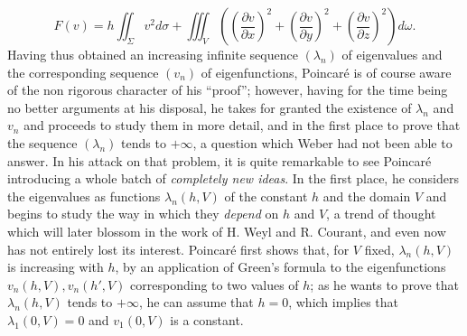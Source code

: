 \documentclass[12pt,a4paper,leqno,twoside]{extbook}
\newcommand{\pder}[2]{\frac{\partial #1}{\partial #2}}
\newcommand{\divergence}[1]{\left(\pder{#1}{x}\right)^2 + \left(\pder{#1}{y}\right)^2 + \left(\pder{#1}{z}\right)^2}
\begin{document}
\begin{equation}
    \label{eq:3.25}
    F(v) = h\iint_\Sigma v^2 d\sigma + \iiint_V \left(\divergence{v}\right)d\omega.
\end{equation}
Having thus obtained an increasing infinite sequence \(\left(\lambda_n\right)\) of eigenvalues and the corresponding sequence \(\left(v_n\right)\) of eigenfunctions, Poincaré is of course aware of the non rigorous character of his ``proof''; however, having for the time being no better arguments at his disposal, he takes for granted the existence of \(\lambda_n\) and \(v_n\) and proceeds to study them in more detail, and in the first place to prove that the sequence \(\left(\lambda_n\right)\) tends to \(+\infty\), a question which Weber had not been able to answer. In his attack on that problem, it is quite remarkable to see Poincaré introducing a whole batch of \emph{completely new ideas}. In the first place, he considers the eigenvalues as functions \(\lambda_n(h, V)\) of the constant \(h\) and the domain \(V\) and begins to study the way in which they \emph{depend} on \(h\) and \(V\), a trend of thought which will later blossom in the work of H. Weyl and R. Courant, and even now has not entirely lost its interest. Poincaré first shows that, for \(V\) fixed, \(\lambda_n(h, V)\) is increasing with \(h\), by an application of Green's formula to the eigenfunctions \(v_n(h, V), v_n(h', V)\) corresponding to two values of \(h\); as he wants to prove that \(\lambda_n(h, V)\) tends to \(+\infty\), he can assume that \(h = 0\), which implies that \(\lambda_1(0, V) = 0\) and \(v_1(0, V)\) is a constant.
\end{document}
